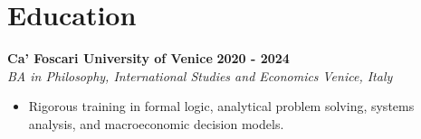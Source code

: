 \documentclass[10pt,a4paper]{article}
\newcommand{\role}[4]{%
  \textbf{#1} \hfill \textbf{#2}\\[1pt]%
  \textit{#3} \hfill \textit{#4}\\[2pt]%
}
\begin{document}
\section{Education}
\role{Ca' Foscari University of Venice}{2020 - 2024}{BA in Philosophy, International Studies and Economics}{Venice, Italy}
\begin{itemize}
  \item Rigorous training in formal logic, analytical problem solving, systems analysis, and macroeconomic decision models.
\end{itemize}
\end{document}

